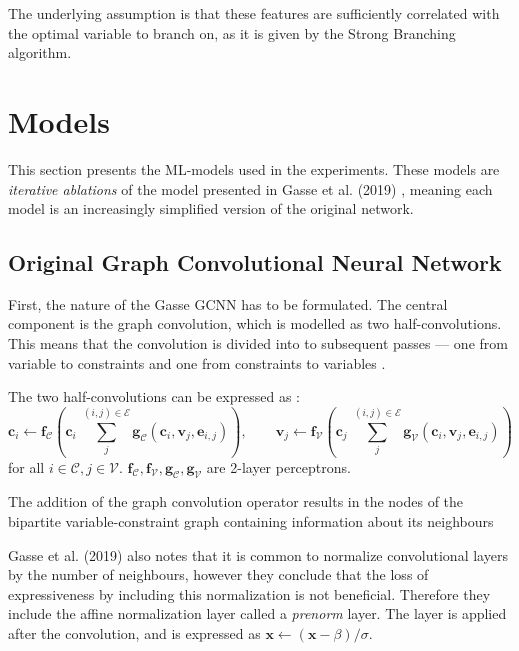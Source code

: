 The underlying assumption is that these features are sufficiently correlated with the optimal variable to branch on, as it is given by the Strong Branching algorithm.



\section{Models}\label{sec:models}

This section presents the \gls{ML}-models used in the experiments. These models are \textit{iterative ablations} of the model presented in Gasse et al. (2019) \cite{gasse2019exact}, meaning each model is an increasingly simplified version of the original network. 


\subsection{Original Graph Convolutional Neural Network}\label{ssec:models_gcnn}

First, the nature of the Gasse GCNN has to be formulated. The central component is the graph convolution, which is modelled as two half-convolutions. This means that the convolution is divided into to subsequent passes --- one from variable to constraints and one from constraints to variables \cite{gasse2019exact}. 

The two half-convolutions can be expressed as \cite{gasse2019exact}:
\begin{equation}
    \mathbf{c}_i \leftarrow \mathbf{f}_{\mathcal{C}}\left( \mathbf{c}_i \; \sum_j^{(i,j) \in \mathcal{E}}\mathbf{g}_{\mathcal{C}} (\mathbf{c}_i, \mathbf{v}_j, \mathbf{e}_{i,j})\right), \qquad
    \mathbf{v}_j \leftarrow \mathbf{f}_{\mathcal{V}}\left( \mathbf{c}_j \; \sum_j^{(i,j) \in \mathcal{E}}\mathbf{g}_{\mathcal{V}} (\mathbf{c}_i, \mathbf{v}_j, \mathbf{e}_{i,j})\right)
\end{equation}
for all $i \in \mathcal{C}, j \in \mathcal{V}$. $\mathbf{f}_{\mathcal{C}},\mathbf{f}_{\mathcal{V}},\mathbf{g}_{\mathcal{C}},\mathbf{g}_{\mathcal{V}}$ are 2-layer perceptrons. 

The addition of the graph convolution operator results in the nodes of the bipartite variable-constraint graph containing information about its neighbours 

Gasse et al. (2019) \cite{gasse2019exact} also notes that it is common to normalize convolutional layers by the number of neighbours, however they conclude that the loss of expressiveness by including this normalization is not beneficial. Therefore they include the affine normalization layer called a \textit{prenorm} layer. The layer is applied after the convolution, and is expressed as $ \mathbf{x} \leftarrow (\mathbf{x}-\beta)/\sigma$. 

